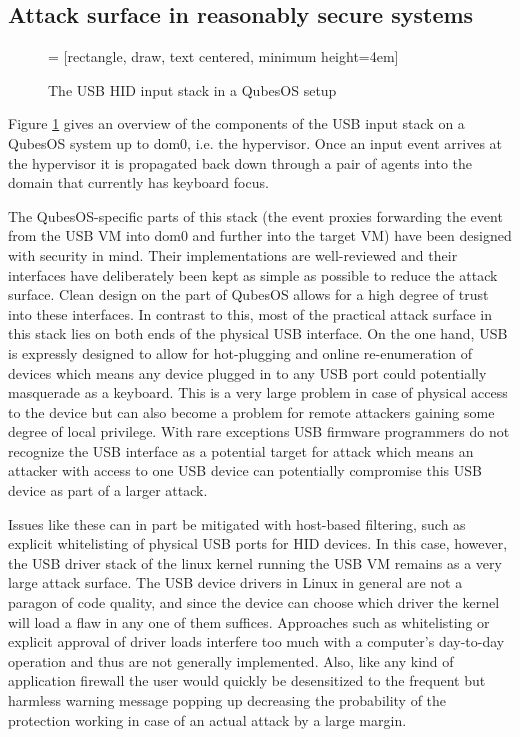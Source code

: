 \documentclass[12pt,a4paper,notitlepage]{article}
\begin{document}
\subsection{Attack surface in reasonably secure systems}
\begin{figure}
 = [rectangle, draw, text centered, minimum height=4em]
\label{qubes-hid-stack}
\caption{The USB HID input stack in a QubesOS setup}
\end{figure}

Figure \ref{qubes-hid-stack} gives an overview of the components of the USB input stack on a QubesOS system up to dom0,
i.e. the hypervisor. Once an input event arrives at the hypervisor it is propagated back down through a pair of agents
into the domain that currently has keyboard focus.

The QubesOS-specific parts of this stack (the event proxies forwarding the event from the USB VM into dom0 and further
into the target VM) have been designed with security in mind. Their implementations are well-reviewed and their
interfaces have deliberately been kept as simple as possible to reduce the attack surface. Clean design on the part of
QubesOS allows for a high degree of trust into these interfaces. In contrast to this, most of the practical attack
surface in this stack lies on both ends of the physical USB interface. On the one hand, USB is expressly designed to
allow for hot-plugging and online re-enumeration of devices which means any device plugged in to any USB port could
potentially masquerade as a keyboard. This is a very large problem in case of physical access to the device but can also
become a problem for remote attackers gaining some degree of local privilege. With rare exceptions USB firmware
programmers do not recognize the USB interface as a potential target for attack which means an attacker with access to
one USB device can potentially compromise this USB device as part of a larger attack.

Issues like these can in part be mitigated with host-based filtering, such as explicit whitelisting of physical USB
ports for HID devices. In this case, however, the USB driver stack of the linux kernel running the USB VM remains as a
very large attack surface. The USB device drivers in Linux in general are not a paragon of code quality, and since the
device can choose which driver the kernel will load a flaw in any one of them suffices. Approaches such as whitelisting
or explicit approval of driver loads interfere too much with a computer's day-to-day operation and thus are not
generally implemented. Also, like any kind of application firewall the user would quickly be desensitized to the
frequent but harmless warning message popping up decreasing the probability of the protection working in case of an
actual attack by a large margin.
\end{document}
